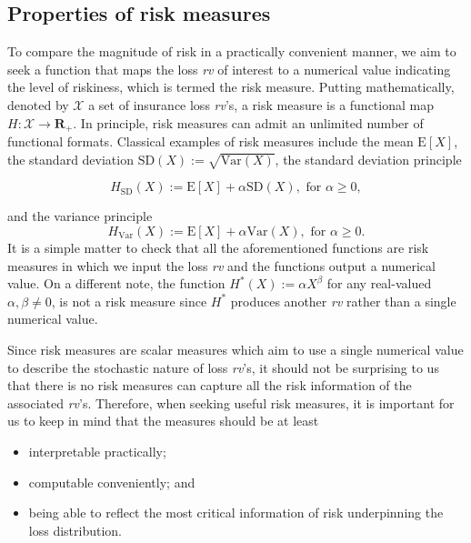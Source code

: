 \documentclass[]{book}
\providecommand{\tightlist}{%
  \setlength{\itemsep}{0pt}\setlength{\parskip}{0pt}}
\theoremstyle{definition}
\theoremstyle{definition}
\theoremstyle{definition}
\theoremstyle{remark}
\begin{document}
\subsection{Properties of risk
measures}\label{properties-of-risk-measures}

To compare the magnitude of risk in a practically convenient manner, we
aim to seek a function that maps the loss \emph{rv} of interest to a
numerical value indicating the level of riskiness, which is termed the
risk measure. Putting mathematically, denoted by \(\mathcal{X}\) a set
of insurance loss \emph{rv}'s, a risk measure is a functional map
\(H:\mathcal{X}\rightarrow \mathbf{R}_+\). In principle, risk measures
can admit an unlimited number of functional formats. Classical examples
of risk measures include the mean \(\mathrm{E}[X]\), the standard
deviation \(\mathrm{SD}(X):=\sqrt{\mathrm{Var}(X)}\), the standard
deviation principle

\begin{equation}
H_{\mathrm{SD}}(X):=\mathrm{E}[X]+\alpha \mathrm{SD}(X),\text{ for } \alpha\geq 0,
\label{eq:SD-principle} 
\end{equation}

and the variance principle \[
H_{\mathrm{Var}}(X):=\mathrm{E}[X]+\alpha \mathrm{Var}(X),\text{ for } \alpha\geq 0.
\] It is a simple matter to check that all the aforementioned functions
are risk measures in which we input the loss \emph{rv} and the functions
output a numerical value. On a different note, the function
\(H^{\ast}(X):=\alpha X^{\beta}\) for any real-valued
\(\alpha,\beta\neq 0\), is not a risk measure since \(H^{\ast}\)
produces another \emph{rv} rather than a single numerical value.

Since risk measures are scalar measures which aim to use a single
numerical value to describe the stochastic nature of loss \emph{rv}'s,
it should not be surprising to us that there is no risk measures can
capture all the risk information of the associated \emph{rv}'s.
Therefore, when seeking useful risk measures, it is important for us to
keep in mind that the measures should be at least

\begin{itemize}
\tightlist
\item
  interpretable practically;\\
\item
  computable conveniently; and\\
\item
  being able to reflect the most critical information of risk
  underpinning the loss distribution.
\end{itemize}
\end{document}

